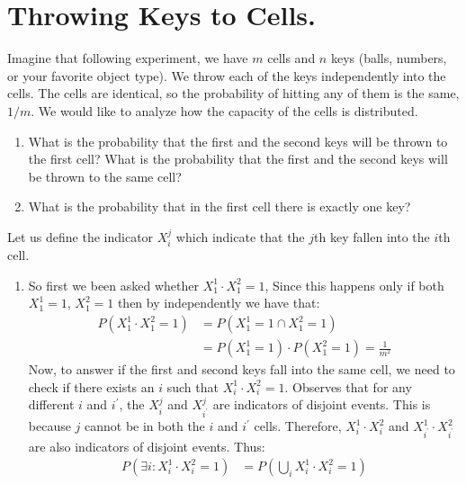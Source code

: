   \section{ Throwing Keys to Cells. }  
  \begin{example} Imagine that following experiment, we have $m$ cells and $n$ keys (balls, numbers, or your favorite object type). We throw each of the keys independently into the cells. The cells are identical, so the probability of hitting any of them is the same, $1/m$. We would like to analyze how the capacity of the cells is distributed.
    \begin{enumerate}
      \item What is the probability that the first and the second keys will be thrown to the first cell? What is the probability that the first and the second keys will be thrown to the same cell? 
      \item What is the probability that in the first cell there is exactly one key? 
    \end{enumerate}
    Let us define the indicator $X_{i}^{j}$ which indicate that the $j$th key fallen into the $i$th cell. 
    \begin{enumerate}
      \item So first we been asked whether $X_{1}^{1}\cdot  X_{1}^{2} = 1$, Since this happens only if both $X_{1}^{1} = 1$, $X_{1}^{2} = 1$ then by independently we have that: 
        \begin{equation*}
          \begin{split}
            P({X_{1}^{1}\cdot  X_{1}^{2} = 1}) &= P(X_{1}^{1} = 1 \cap  X_{1}^{2} = 1) \\
            & = P(X_{1}^{1} = 1 ) \cdot P( X_{1}^{2} = 1) =\frac{1}{m^2}
          \end{split}
        \end{equation*} Now, to answer if the first and second keys fall into the same cell, we need to check if there exists an $i$ such that $X_{i}^{1}\cdot X_{i}^{2} = 1$. Observes that for any different $i$ and $i^{\prime}$, the $X_{i}^{j}$ and $X_{i^{\prime}}^{j}$ are indicators of disjoint events. This is because $j$ cannot be in both the $i$ and $i^{\prime}$ cells. Therefore, $X_{i}^{1}\cdot X_{i}^{2}$ and $X_{i^{\prime}}^{1}\cdot X_{i^{\prime}}^{2}$ are also indicators of disjoint events. Thus: 
        \begin{equation*}
          \begin{split}
            P(\exists i : X_{i}^1 \cdot X_{i}^{2} = 1) &= P( \bigcup_{i} X_{i}^1 \cdot X_{i}^{2} = 1) \\

\end{split}
\end{equation*}
\end{enumerate}
\end{example}
